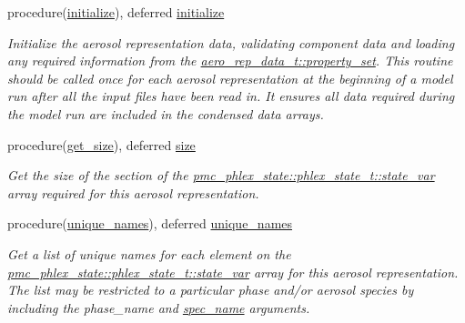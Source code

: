 \begin{DoxyCompactItemize}
\item 
procedure(\mbox{\hyperlink{interfacepmc__aero__rep__data_1_1initialize}{initialize}}), deferred \mbox{\hyperlink{structpmc__aero__rep__data_1_1aero__rep__data__t_aa02828c1308ce18b054cfdc01d3ce997}{initialize}}
\begin{DoxyCompactList}\small\item\em Initialize the aerosol representation data, validating component data and loading any required information from the {\ttfamily \mbox{\hyperlink{structpmc__aero__rep__data_1_1aero__rep__data__t_a87b1bf5cd10a0a2b51390fb24ebf56c5}{aero\+\_\+rep\+\_\+data\+\_\+t\+::property\+\_\+set}}}. This routine should be called once for each aerosol representation at the beginning of a model run after all the input files have been read in. It ensures all data required during the model run are included in the condensed data arrays. \end{DoxyCompactList}\item 
procedure(\mbox{\hyperlink{interfacepmc__aero__rep__data_1_1get__size}{get\+\_\+size}}), deferred \mbox{\hyperlink{structpmc__aero__rep__data_1_1aero__rep__data__t_a7fb0727cb376d1b94e7c2cb643c37e5c}{size}}
\begin{DoxyCompactList}\small\item\em Get the size of the section of the {\ttfamily \mbox{\hyperlink{structpmc__phlex__state_1_1phlex__state__t_a78835cb552d483ebbfc7a6bc6f756918}{pmc\+\_\+phlex\+\_\+state\+::phlex\+\_\+state\+\_\+t\+::state\+\_\+var}}} array required for this aerosol representation. \end{DoxyCompactList}\item 
procedure(\mbox{\hyperlink{interfacepmc__aero__rep__data_1_1unique__names}{unique\+\_\+names}}), deferred \mbox{\hyperlink{structpmc__aero__rep__data_1_1aero__rep__data__t_a96fbf02225909dc0c2eccec4895c98ac}{unique\+\_\+names}}
\begin{DoxyCompactList}\small\item\em Get a list of unique names for each element on the {\ttfamily \mbox{\hyperlink{structpmc__phlex__state_1_1phlex__state__t_a78835cb552d483ebbfc7a6bc6f756918}{pmc\+\_\+phlex\+\_\+state\+::phlex\+\_\+state\+\_\+t\+::state\+\_\+var}}} array for this aerosol representation. The list may be restricted to a particular phase and/or aerosol species by including the phase\+\_\+name and \mbox{\hyperlink{interfacepmc__aero__rep__data_1_1spec__name}{spec\+\_\+name}} arguments. \end{DoxyCompactList}\item 

\end{DoxyCompactItemize}
